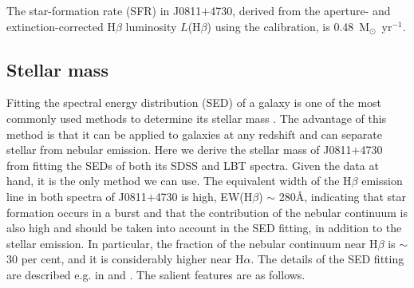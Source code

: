 \documentclass[useAMS,usenatbib]{mn2e}
\begin{document}
The star-formation rate (SFR) in J0811$+$4730, 
derived from the aperture- and extinction-corrected H$\beta$ luminosity 
$L$(H$\beta$) using the \citet{K98} calibration, is 0.48~M$_\odot$~yr$^{-1}$.

\subsection{Stellar mass}





Fitting the spectral energy distribution (SED) of a galaxy is one of the most commonly 
used methods to determine its stellar mass \citep[e.g. ][]{CF05,As07}. The 
advantage of this method is that it can be applied to  
galaxies at any redshift and can separate stellar from nebular emission.
Here we derive the stellar mass of J0811$+$4730 from fitting the 
SEDs of both its SDSS and LBT spectra. 
Given the data at hand, it is the only method we can use.
The equivalent width of the
H$\beta$ emission line in both spectra of J0811$+$4730 is high,
EW(H$\beta$) $\sim$ 280\AA, indicating that star formation occurs in a burst
and that the contribution of the nebular continuum is also high and should be 
taken into account in the SED fitting, in addition to the stellar emission. 
In particular, the fraction of the nebular continuum near H$\beta$ is 
$\sim$ 30 per cent, and it is considerably higher near H$\alpha$.
The details of the SED fitting are described e.g. in \citet*{I11} and 
\citet{I15}. The salient features are as follows.
\end{document}
